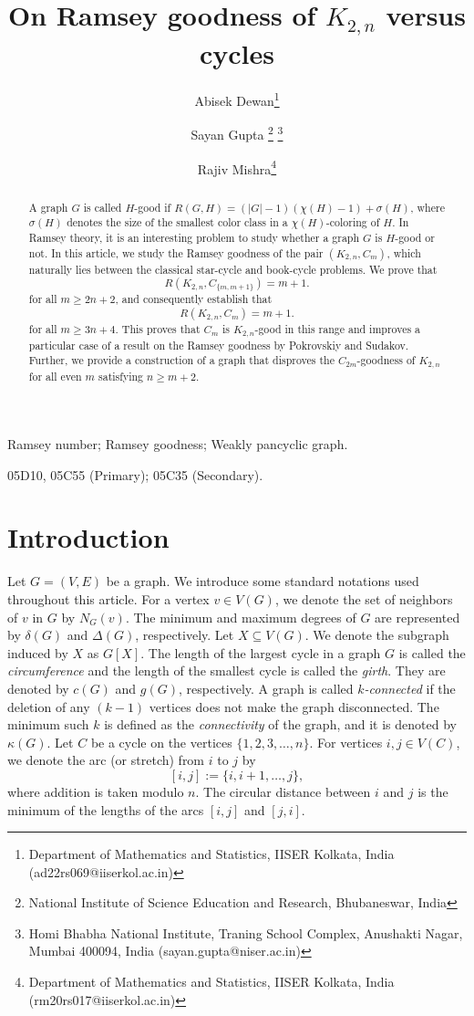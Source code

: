 \documentclass[12pt]{article}
\title{On Ramsey goodness of $K_{2,n}$ versus cycles}
\author{Abisek Dewan\footnote{Department of Mathematics and Statistics, IISER Kolkata, India (ad22rs069@iiserkol.ac.in)}\and Sayan Gupta \footnote{National Institute of Science Education and Research,  Bhubaneswar, India} \footnote{ Homi Bhabha National Institute, Traning School Complex, Anushakti Nagar, Mumbai 400094, India (sayan.gupta@niser.ac.in)} \and Rajiv Mishra\footnote{Department of Mathematics and Statistics, IISER Kolkata, India (rm20rs017@iiserkol.ac.in)}}
\date{}
\theoremstyle{definition}
\begin{document}
\maketitle
\begin{abstract}

A graph $G$ is called $H$-good if $R(G,H)=(|G|-1)(\chi(H)-1)+\sigma(H)$, where $\sigma(H)$ denotes the size of the smallest color class in a $\chi(H)$-coloring of $H$. In Ramsey theory, it is an interesting problem to study whether a graph $G$ is $H$-good or not. In this article, we study the Ramsey goodness of the pair $(K_{2,n},C_m)$, which naturally lies between the classical star-cycle and book-cycle problems.  We prove that
\begin{equation*}
    R(K_{2,n},C_{\{m,m+1\}})=m+1.
\end{equation*}
for all $m\ge 2n+2$, and consequently establish that 
\begin{equation*}
    R(K_{2,n},C_{m})=m+1.
\end{equation*}
for all $m\ge 3n+4$. This proves that $C_m$ is $K_{2,n}$-good in this range and improves a particular case of a result on the Ramsey goodness by Pokrovskiy and Sudakov.  Further, we provide a construction of a graph that disproves the $C_{2m}$-goodness of $K_{2,n}$ for all even $m$ satisfying $n\geq m+2$.
\end{abstract}
 Ramsey number; Ramsey goodness; Weakly pancyclic graph.

 05D10, 05C55 (Primary); 05C35 (Secondary).
\section{Introduction}
Let $G=(V,E)$ be a graph. We introduce some standard notations used throughout this article. For a vertex $v\in V(G)$, we denote the set of neighbors of $v$ in $G$ by $N_{G}(v)$. The minimum and maximum degrees of $G$ are represented by $\delta(G)$ and $\Delta(G)$, respectively. Let $X\subseteq V(G)$. We denote the subgraph induced by $X$ as $G[X]$. The length of the largest cycle in a graph $G$ is called the \emph{circumference} and the length of the smallest cycle is called the \emph{girth}. They are denoted by $c(G)$ and $g(G)$, respectively. A graph is called \emph{$k$-connected} if the deletion of any $(k-1)$ vertices does not make the graph disconnected. The minimum such $k$ is defined as the \emph{connectivity} of the graph, and it is denoted by $\kappa(G)$. Let $C$ be a cycle on the vertices $\{1,2,3,\ldots ,n\}$. For vertices $i,j\in V(C)$, we denote the arc (or stretch) from $i$ to $j$ by
\[
[i,j]:=\{i,i+1,\ldots,j\},
\]
where addition is taken modulo $n$. The circular distance between $i$ and $j$ is the minimum of the lengths of the arcs $[i,j]$ and $[j,i]$.
\end{document}
